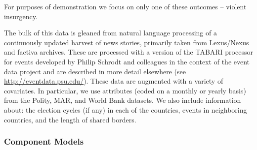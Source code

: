 \documentclass[pdftex,12pt,fullpage,oneside]{amsart}
\begin{document}
    For purposes of
demonstration we focus on only one of these outcomes -- violent
insurgency.

The bulk of this data is gleaned from natural language processing of a
continuously updated harvest of news stories, primarily taken from
Lexus/Nexus and factiva archives. These are processed with a version of the TABARI
processor for events developed by Philip Schrodt and colleagues in the
context of the event data project and are described in more detail
elsewhere (see \url{http://eventdata.psu.edu/}).  These data are
augmented with a variety of covariates. In particular, we use
attributes (coded on a monthly or yearly basis) from the Polity, MAR,
and World Bank datasets. We also include information about: the
election cycles (if any) in each of the countries, events in
neighboring countries, and the length of shared borders.

\subsubsection{Component Models}

\end{document}

